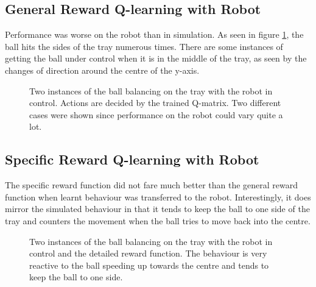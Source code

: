 \documentclass[12pt,a4paper]{article}
\begin{document}
\subsection{General Reward Q-learning with Robot}
Performance was worse on the robot than in simulation. As seen in figure \ref{q_nao}, the ball hits the sides of the tray numerous times. There are some instances of getting the ball under control when it is in the middle of the tray, as seen by the changes of direction around the centre of the y-axis.
\begin{figure}[H]
	\centering
	\caption{Two instances of the ball balancing on the tray with the robot in control. Actions are decided by the trained Q-matrix. Two different cases were shown since performance on the robot could vary quite a lot.}
	\label{q_nao}
\end{figure}

\subsection{Specific Reward Q-learning with Robot}
The specific reward function did not fare much better than the general reward function when learnt behaviour was transferred to the robot. Interestingly, it does mirror the simulated behaviour in that it tends to keep the ball to one side of the tray and counters the movement when the ball tries to move back into the centre.
\begin{figure}[H]
	\centering
	\caption{Two instances of the ball balancing on the tray with the robot in control and the detailed reward function. The behaviour is very reactive to the ball speeding up towards the centre and tends to keep the ball to one side.}
	\label{q_nao_specific}
\end{figure}
\end{document}
